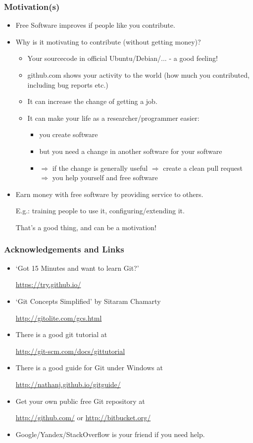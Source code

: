 \documentclass[ignoreframetext,envcountsect]{beamer}
\newif\ifsnop\snoptrue
\newcommand{\bi}{\begin{itemize}}
\newcommand{\ei}{\end{itemize}}
\newcommand{\cemph}[1]{{\color{red}#1}}
\begin{document}
\ifsnop
\begin{frame}
\frametitle{Motivation(s)}
\bi
\item Free Software improves if people \cemph{like you} contribute.
\medskip
\item Why is it motivating to contribute (without getting money)?
  \bi
  \item Your sourcecode in official Ubuntu/Debian/... - a good feeling!
  \item github.com shows your activity to the world
    (how much you contributed, including bug reports etc.)
  \item It can increase the change of getting a job.
  \item It can make your life as a researcher/programmer easier:
    \bi
    \item you create software
    \item but you need a change in another software for your software
    \item[$\Rightarrow$] if the change is generally useful
      $\Rightarrow$ create a clean pull request
      $\Rightarrow$ you help yourself and free software
    \ei
  \ei
\medskip
\item Earn money with free software by providing \cemph{service} to others.
  
  E.g.: training people to use it, configuring/extending it.
  
  That's a good thing, and can be a motivation!
\ei
\end{frame}
\fi


\ifsnop
\begin{frame}
\frametitle{Acknowledgements and Links}
\bi
\item
	`Got 15 Minutes and want to learn Git?'

	\centerline{
	\url{https://try.github.io/}
	}
\item
  `Git Concepts Simplified' by Sitaram Chamarty

  \centerline{
  \url{http://gitolite.com/gcs.html}
  }
\item
  There is a good git tutorial at

  \centerline{
  \url{http://git-scm.com/docs/gittutorial}
  }
\item
  There is a good guide for Git under Windows at

  \centerline{
  \url{http://nathanj.github.io/gitguide/}
  }
\item
  Get your own public free Git repository at
  
  \centerline{
  \url{http://github.com/} or \url{http://bitbucket.org/}
  }
\item
  Google/Yandex/StackOverflow is your friend if you need help.
\ei
\end{frame}
\fi
\end{document}
